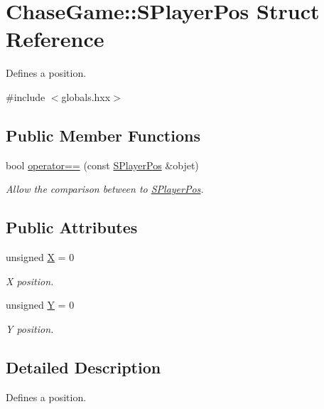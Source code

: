 \hypertarget{struct_chase_game_1_1_s_player_pos}{\section{Chase\-Game\-:\-:S\-Player\-Pos Struct Reference}
\label{struct_chase_game_1_1_s_player_pos}
}


Defines a position.  




{\ttfamily \#include $<$globals.\-hxx$>$}

\subsection*{Public Member Functions}
\begin{DoxyCompactItemize}
\item 
bool \hyperlink{struct_chase_game_1_1_s_player_pos_a16d84d116194f402b751f7265dd4fb91}{operator==} (const \hyperlink{struct_chase_game_1_1_s_player_pos}{S\-Player\-Pos} \&objet)
\begin{DoxyCompactList}\small\item\em Allow the comparison between to \hyperlink{struct_chase_game_1_1_s_player_pos}{S\-Player\-Pos}. \end{DoxyCompactList}\end{DoxyCompactItemize}
\subsection*{Public Attributes}
\begin{DoxyCompactItemize}
\item 
unsigned \hyperlink{struct_chase_game_1_1_s_player_pos_a28b353619ad10ef89da6308319b6ee39}{X} = 0
\begin{DoxyCompactList}\small\item\em X position. \end{DoxyCompactList}\item 
unsigned \hyperlink{struct_chase_game_1_1_s_player_pos_a0e20d9da2b1da89994a83e8acd72814c}{Y} = 0
\begin{DoxyCompactList}\small\item\em Y position. \end{DoxyCompactList}\end{DoxyCompactItemize}


\subsection{Detailed Description}
Defines a position. 

